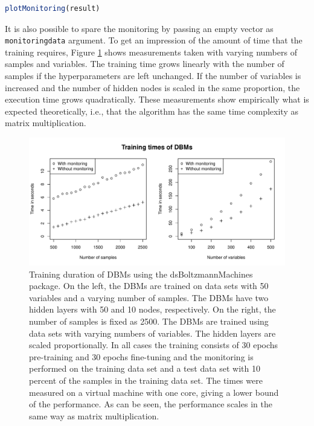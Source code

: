 \documentclass[12pt]{article}
\newcommand{\inlinecode}[1]{\texttt{#1}}
\begin{document}
\begin{lstlisting}[language=R, float=!h]
plotMonitoring(result)
\end{lstlisting}

It is also possible to spare the monitoring by passing an empty vector as \inlinecode{monitoringdata} argument.
To get an impression of the amount of time that the training requires, Figure \ref{fig:dbmtrainingtimes} shows measurements taken with varying numbers of samples and variables.
The training time grows linearly with the number of samples if the hyperparameters are left unchanged.
If the number of variables is increased and the number of hidden nodes is scaled in the same proportion, the execution time grows quadratically.
These measurements show empirically what is expected theoretically, i.e., that the algorithm has the same time complexity as matrix multiplication.

\begin{figure}[hb]
   \centering
   \includegraphics[scale=.6]{images/trainingtimes.pdf}
   \caption{Training duration of DBMs using the dsBoltzmannMachines package. On the left, the DBMs are trained on data sets with 50 variables and a varying number of samples. The DBMs have two hidden layers with 50 and 10 nodes, respectively. On the right, the number of samples is fixed as 2500. The DBMs are trained using data sets with varying numbers of variables. The hidden layers are scaled proportionally. In all cases the training consists of 30 epochs pre-training and 30 epochs fine-tuning and the monitoring is performed on the training data set and a test data set with 10 percent of the samples in the training data set. The times were measured on a virtual machine with one core, giving a lower bound of the performance. As can be seen, the performance scales in the same way as matrix multiplication. }
   \label{fig:dbmtrainingtimes}
 \end{figure}
\end{document}
